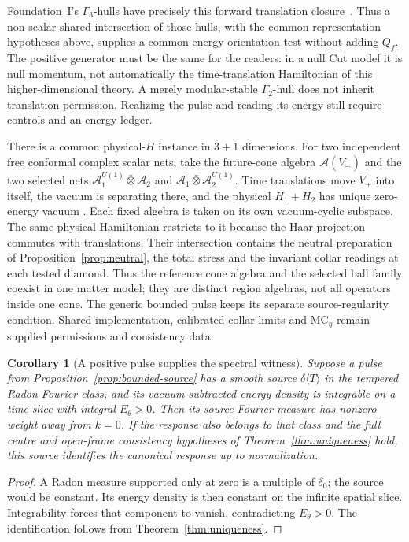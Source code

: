 \documentclass[12pt]{article}
\newtheorem{corollary}[theorem]{Corollary}
\theoremstyle{definition}
\theoremstyle{remark}
\newcommand{\dT}{\delta\langle T\rangle}
\begin{document}
Foundation~I's \(\Gamma_3\)-hulls have precisely this forward translation
closure~\cite[Theorem on Cut inheritance]{FoundationI}. Thus a non-scalar
shared intersection of those hulls, with the common representation hypotheses
above, supplies a common energy-orientation test without adding \(Q_f\).
The positive generator must be the same for the readers: in a null Cut model it
is null momentum, not automatically the time-translation Hamiltonian of this
higher-dimensional theory. A merely modular-stable \(\Gamma_2\)-hull does
not inherit translation permission. Realizing the pulse and reading its energy
still require controls and an energy ledger.

There is a common physical-$H$ instance in $3+1$ dimensions.
For two independent free conformal complex scalar nets, take the
future-cone algebra $\mathcal A(V_+)$ and the two selected nets
$\mathcal A_1^{U(1)}\bar\otimes\mathcal A_2$ and
$\mathcal A_1\bar\otimes\mathcal A_2^{U(1)}$.
Time translations move $V_+$ into itself, the vacuum is separating
there, and the physical $H_1+H_2$ has unique zero-energy vacuum
\cite{HislopLongo1982,BGL1993}. Each fixed algebra is taken on its own
vacuum-cyclic subspace. The same physical Hamiltonian restricts to it
because the Haar projection commutes with translations.
Their intersection contains the neutral preparation of
Proposition~\ref{prop:neutral}, the total stress and the invariant
collar readings at each tested diamond. Thus the reference cone
algebra and the selected ball family coexist in one matter model;
they are distinct region algebras, not all operators inside one cone.
The generic bounded pulse keeps its separate source-regularity
condition. Shared implementation, calibrated collar limits and
$\mathrm{MC}_\eta$ remain supplied permissions and consistency data.

\begin{corollary}[A positive pulse supplies the spectral witness]
\label{cor:pulse-witness}
Suppose a pulse from Proposition~\ref{prop:bounded-source} has a smooth source
\(\dT\) in the tempered Radon Fourier class, and its vacuum-subtracted energy
density is integrable on a time slice with integral \(E_\theta>0\).
Then its source Fourier measure has nonzero weight away from \(k=0\).
If the response also belongs to that class and the full centre and open-frame
consistency hypotheses of Theorem~\ref{thm:uniqueness} hold, this source identifies
the canonical response up to normalization.
\end{corollary}
\begin{proof}
A Radon measure supported only at zero is a multiple of \(\delta_0\);
the source would be constant. Its energy density is then constant on the
infinite spatial slice. Integrability forces that component to vanish,
contradicting \(E_\theta>0\). The identification follows from
Theorem~\ref{thm:uniqueness}.
\end{proof}
\end{document}
